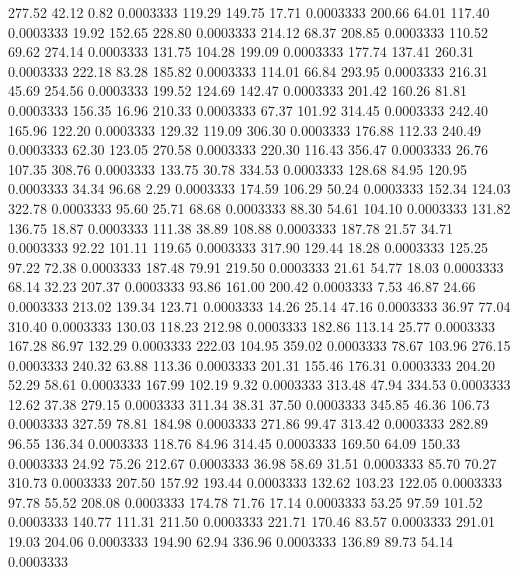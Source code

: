  277.52   42.12    0.82   0.0003333
 119.29  149.75   17.71   0.0003333
 200.66   64.01  117.40   0.0003333
  19.92  152.65  228.80   0.0003333
 214.12   68.37  208.85   0.0003333
 110.52   69.62  274.14   0.0003333
 131.75  104.28  199.09   0.0003333
 177.74  137.41  260.31   0.0003333
 222.18   83.28  185.82   0.0003333
 114.01   66.84  293.95   0.0003333
 216.31   45.69  254.56   0.0003333
 199.52  124.69  142.47   0.0003333
 201.42  160.26   81.81   0.0003333
 156.35   16.96  210.33   0.0003333
  67.37  101.92  314.45   0.0003333
 242.40  165.96  122.20   0.0003333
 129.32  119.09  306.30   0.0003333
 176.88  112.33  240.49   0.0003333
  62.30  123.05  270.58   0.0003333
 220.30  116.43  356.47   0.0003333
  26.76  107.35  308.76   0.0003333
 133.75   30.78  334.53   0.0003333
 128.68   84.95  120.95   0.0003333
  34.34   96.68    2.29   0.0003333
 174.59  106.29   50.24   0.0003333
 152.34  124.03  322.78   0.0003333
  95.60   25.71   68.68   0.0003333
  88.30   54.61  104.10   0.0003333
 131.82  136.75   18.87   0.0003333
 111.38   38.89  108.88   0.0003333
 187.78   21.57   34.71   0.0003333
  92.22  101.11  119.65   0.0003333
 317.90  129.44   18.28   0.0003333
 125.25   97.22   72.38   0.0003333
 187.48   79.91  219.50   0.0003333
  21.61   54.77   18.03   0.0003333
  68.14   32.23  207.37   0.0003333
  93.86  161.00  200.42   0.0003333
   7.53   46.87   24.66   0.0003333
 213.02  139.34  123.71   0.0003333
  14.26   25.14   47.16   0.0003333
  36.97   77.04  310.40   0.0003333
 130.03  118.23  212.98   0.0003333
 182.86  113.14   25.77   0.0003333
 167.28   86.97  132.29   0.0003333
 222.03  104.95  359.02   0.0003333
  78.67  103.96  276.15   0.0003333
 240.32   63.88  113.36   0.0003333
 201.31  155.46  176.31   0.0003333
 204.20   52.29   58.61   0.0003333
 167.99  102.19    9.32   0.0003333
 313.48   47.94  334.53   0.0003333
  12.62   37.38  279.15   0.0003333
 311.34   38.31   37.50   0.0003333
 345.85   46.36  106.73   0.0003333
 327.59   78.81  184.98   0.0003333
 271.86   99.47  313.42   0.0003333
 282.89   96.55  136.34   0.0003333
 118.76   84.96  314.45   0.0003333
 169.50   64.09  150.33   0.0003333
  24.92   75.26  212.67   0.0003333
  36.98   58.69   31.51   0.0003333
  85.70   70.27  310.73   0.0003333
 207.50  157.92  193.44   0.0003333
 132.62  103.23  122.05   0.0003333
  97.78   55.52  208.08   0.0003333
 174.78   71.76   17.14   0.0003333
  53.25   97.59  101.52   0.0003333
 140.77  111.31  211.50   0.0003333
 221.71  170.46   83.57   0.0003333
 291.01   19.03  204.06   0.0003333
 194.90   62.94  336.96   0.0003333
 136.89   89.73   54.14   0.0003333
